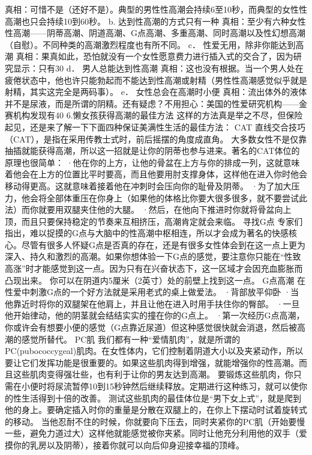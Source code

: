 \documentclass[12pt,UTF8]{ctexbook}
\begin{document}
真相：可惜不是（还好不是）。典型的男性性高潮会持续6至10秒，而典型的女性性高潮也只会持续10到60秒。
b. 达到性高潮的方式只有一种
真相：至少有六种女性性高潮——阴蒂高潮、阴道高潮、G点高潮、多重高潮、同时高潮以及性幻想高潮（自慰）。不同种类的高潮激烈程度也有所不同。
c． 性爱无用，除非你能达到高潮
真相：果真如此，恐怕就没有一个女性愿意费力进行插入式的交合了，因为研究显示：只有30%
d． 男人总能达到性高潮
真相：这也没有根据。当一个男人处在疲倦状态中，他也许只能勃起而不能达到性高潮或射精（男性性高潮感觉似乎就是射精，其实这完全是两码事）。
e． 女性总会在高潮时小便
真相：流出体外的液体并不是尿液，而是所谓的阴精。还有疑虑？不用担心：美国的性爱研究机构——金赛机构发现有40%
6.懒女孩获得高潮的最佳方法
这样的方法真是举之不尽，但保险起见，还是来了解一下下面四种保证美满性生活的最佳方法：
CAT
直线交合技巧（CAT），是指在采用传教士式时，前后摇摆的角度成直角。
大多数女性不是仅靠抽插就能获得高潮，所以这一招就是让你的阴蒂也参与进来。著名的CAT体位的原理也很简单：
·他在你的上方，让他的骨盆在上方与你的排成一列，这就意味着他会在上方的位置比平时要高，而且他要用肘支撑身体，这样他在进入你时他会移动得更高。这就意味着接着他在冲刺时会压向你的耻骨及阴蒂。
·为了加大压力，他会将全部体重压在你身上（如果他的体格比你要大很多很多，就不要尝试此法）而你就要用双腿夹住他的大腿。
·然后，在他向下推进时你就将骨盆向上顶，而且只要保持稳定的节奏来互相挤压，高潮肯定就会来临。
寻找G点
专家们指出，难以捉摸的G点与大脑中的性高潮中枢相连，所以才会成为著名的快感核心。尽管有很多人怀疑G点是否真的存在，还是有很多女性体会到在这一点上更为深入、持久和激烈的高潮。如果你想体验一下G点的感觉，要注意你只能在“性致高涨”时才能感觉到这一点。因为只有在兴奋状态下，这一区域才会因充血膨胀而凸现出来。
你可以在阴道内5厘米（2英寸）处的前壁上找到这一点。
G点高潮
在性爱中刺激G点的一个好方法就是采用老式的桌上做爱法。
·背部放平仰卧
·当他靠近时将你的双腿架在他肩上，并且让他在进入时用手扶住你的臀部。
·一旦他开始律动，他的阴茎就会结结实实的撞在你的G点上。
·第一次经历G点高潮，你或许会有想要小便的感觉（G点靠近尿道）但这种感觉很快就会消退，然后被高潮的感觉所替代。
PC肌
我们都有一种“爱情肌肉”，就是所谓的PC(pubococcygeal)肌肉。在女性体内，它们控制着阴道大小以及夹紧动作，所以要让它们发挥功能是很重要的。如果这些肌肉得到增强，就能增强你的性高潮。而且这些肌肉变得强壮些，也有利于让你的男友达到高潮。
要锻炼这些肌肉，你只需在小便时将尿流暂停10到15秒钟然后继续释放。定期进行这种练习，就可以使你的性生活得到十倍的改善。
测试这些肌肉的最佳体位是“男下女上式”，就是爬到他的身上。要确定插入时你的重量是分散在双腿上的，在你上下摆动时试着旋转式的移动。
当他忍耐不住的时候，你就要向下压去，同时夹紧你的PC肌（开始要慢一些，避免力道过大）这样他就能感觉被你夹紧。同时让他充分利用他的双手（爱摸你的乳房以及阴蒂），接着你就可以向后仰身迎接幸福的顶峰。
\end{document}
